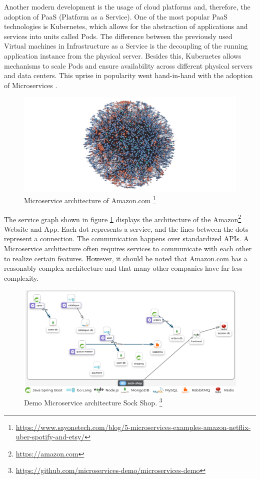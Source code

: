 Another modern development is the usage of cloud platforms and, therefore, the adoption of PaaS (Platform as a Service). One of the most popular PaaS technologies is Kubernetes, which allows for the abstraction of applications and services into units called Pods. The difference between the previously used Virtual machines in Infrastructure as a Service is the decoupling of the running application instance from the physical server. Besides this, Kubernetes allows mechanisms to scale Pods and ensure availability across different physical servers and data centers. This uprise in popularity went hand-in-hand with the adoption of Microservices \cite{hardikar_containerization_2021}.

\begin{figure}[!htb]
  \centering
  \includegraphics[width=0.95\columnwidth]{amazon.png}
  \caption[Amazon Architecture]{Microservice architecture of Amazon.com \footnote{\url{https://www.sayonetech.com/blog/5-microservices-examples-amazon-netflix-uber-spotify-and-etsy/}}}  
  \label{fig:amazon-arch}
\end{figure}

The service graph shown in figure \ref{fig:amazon-arch} displays the architecture of the Amazon\footnote{\url{https://amazon.com}} Website and App.
Each dot represents a service, and the lines between the dots represent a connection. The communication happens over standardized APIs. A Microservice architecture often requires services to communicate with each other to realize certain features. However, it should be noted that Amazon.com has a reasonably complex architecture and that many other companies have far less complexity.

\begin{figure}[!htb]
  \centering
  \includegraphics[width=0.95\columnwidth]{sockshop.png}
  \caption[Sockshop Architecture]{Demo Microservice architecture Sock Shop. \footnote{\url{https://github.com/microservices-demo/microservices-demo}}} 
  \label{fig:sockshop-arch}
\end{figure}

